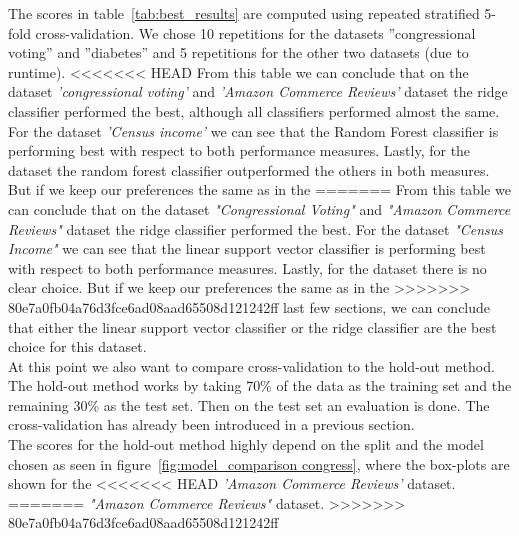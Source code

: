 \documentclass[a4paper,10pt]{article}
\begin{document}
The scores in table~\ref{tab:best_results} are computed using repeated stratified 5-fold
cross-validation. We chose 10 repetitions for the datasets ”congressional voting” and ”diabetes” and 5
repetitions for the other two datasets (due to runtime).
<<<<<<< HEAD
From this table we can conclude that on the dataset \textit{'congressional voting'} and 
\textit{'Amazon Commerce Reviews'} dataset the ridge classifier
performed the best, although all classifiers performed almost the same. For the dataset \textit{'Census income'} we can see that
the Random Forest classifier is performing best with respect to both performance measures. Lastly,
for the  dataset the random forest classifier outperformed the others in both measures. But if we keep our preferences the same as in the
=======
From this table we can conclude that on the dataset \textit{"Congressional Voting"} and 
\textit{"Amazon Commerce Reviews"} dataset the ridge classifier
performed the best. For the dataset \textit{"Census Income"} we can see that
the linear support vector classifier is performing best with respect to both performance measures. Lastly,
for the  dataset there is no clear choice. But if we keep our preferences the same as in the
>>>>>>> 80e7a0fb04a76d3fce6ad08aad65508d121242ff
last few sections, we can conclude that either the linear support vector classifier or the ridge classifier
are the best choice for this dataset. \\
At this point we also want to compare cross-validation to the hold-out method. 
The hold-out method works by taking 70\% of the data as the training set and the remaining 30\% as the test set.
Then on the test set an evaluation is done. The cross-validation has already been introduced in a previous section.\\
The scores for the hold-out method
highly depend on the split and the model chosen as seen in figure~\ref{fig:model_comparison congress},
where the box-plots are shown for the
<<<<<<< HEAD
\textit{'Amazon Commerce Reviews'} dataset.
=======
\textit{"Amazon Commerce Reviews"} dataset.
>>>>>>> 80e7a0fb04a76d3fce6ad08aad65508d121242ff
\end{document}
